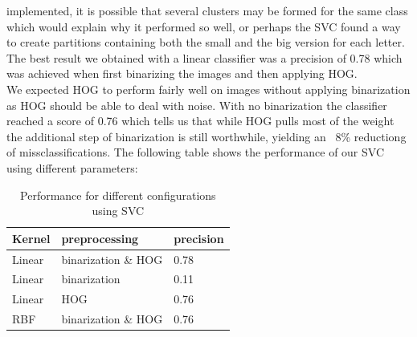 \documentclass[paper=a4, fontsize=11pt]{scrartcl} %
\numberwithin{equation}{section} %
\numberwithin{figure}{section} %
\numberwithin{table}{section} %
\begin{document}
implemented, it is possible that several clusters may be formed for
the same class which would explain why it performed so well, or
perhaps the SVC found a way to create partitions containing both the
small and the big version for each letter.\\  The best result we
obtained with a linear classifier was a precision of 0.78 which was
achieved when first binarizing the images and then applying HOG.\\
We expected HOG to perform fairly well on images without
applying binarization as HOG should be able to deal with noise.  With
no binarization the classifier reached a score of 0.76 which tells us
that while HOG pulls most of the weight the additional step of
binarization is still worthwhile, yielding an ~8\% reductiong of
missclassifications.  The following table shows the performance of our
SVC using different parameters:
\begin{table}[H]
    \centering
    \begin{tabular}{l | l | l}
        Kernel & preprocessing & precision\\ \hline
        Linear & binarization \& HOG & 0.78 \\ \hline
        Linear & binarization & 0.11 \\ \hline
        Linear & HOG & 0.76\\ \hline
        RBF & binarization \& HOG & 0.76\\
    \end{tabular}
    \caption{Performance for different configurations using SVC}
\end{table}
\end{document}
